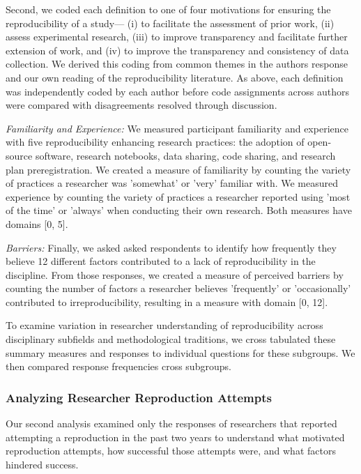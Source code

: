 \documentclass[]{interact}
\theoremstyle{plain}%
\theoremstyle{definition}
\theoremstyle{remark}
\begin{document}
Second, we coded each definition to one of four motivations for ensuring the reproducibility of a study--- (i) to facilitate the assessment of prior work, (ii) assess experimental research, (iii) to improve transparency and facilitate further extension of work, and (iv) to improve the transparency and consistency of data collection.
We derived this coding from common themes in the authors response and our own reading of the reproducibility literature.
As above, each definition was independently coded by each author before code assignments across authors were compared with disagreements resolved through discussion.

\textit{Familiarity and Experience:} We measured participant familiarity and experience with five reproducibility enhancing research practices: the adoption of open-source software, research notebooks, data sharing, code sharing, and research plan preregistration. 
We created a measure of familiarity by counting the variety of practices a researcher was 'somewhat' or 'very' familiar with.
We measured experience by counting the variety of practices a researcher reported using 'most of the time' or 'always' when conducting their own research. 
Both measures have domains [0, 5]. 

\textit{Barriers:} Finally, we asked asked respondents to identify how frequently they believe 12 different factors contributed to a lack of reproducibility in the discipline. 
From those responses, we created a measure of perceived barriers by counting the number of factors a researcher believes 'frequently' or 'occasionally' contributed to irreproducibility, resulting in a measure with domain [0, 12].

To examine variation in researcher understanding of reproducibility across disciplinary subfields and methodological traditions, we cross tabulated these summary measures and responses to individual questions for these subgroups. 
We then compared response frequencies cross subgroups.

\subsubsection*{Analyzing Researcher Reproduction Attempts}
\noindent Our second analysis examined only the responses of researchers that reported attempting a reproduction in the past two years to understand what motivated reproduction attempts, how successful those attempts were, and what factors hindered success.
\end{document}

